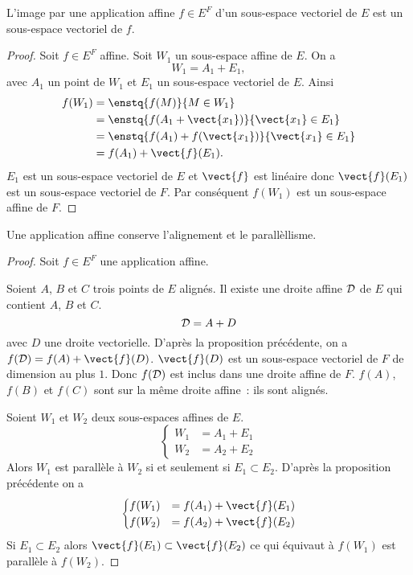 \begin{prop}
  L'image par une application affine $f \in E^F$ d'un sous-espace vectoriel de $E$ est un sous-espace vectoriel de $f$.
\end{prop}
\begin{proof}
  Soit $f \in E^F$ affine. Soit $W_1$ un sous-espace affine de $E$. On a
  \begin{equation}
    W_1 = A_1 +E_1,
  \end{equation}
  avec $A_1$ un point de $W_1$ et $E_1$ un sous-espace vectoriel de $E$. Ainsi
  \begin{align}
    f(W_1) &= \enstq{f(M)}{M \in W_1} \\
    &= \enstq{f(A_1+\vect{x_1})}{\vect{x_1} \in E_1} \\
    &= \enstq{f(A_1)+f(\vect{x_1})}{\vect{x_1} \in E_1} \\
    &=f(A_1) + \vect{f}(E_1).
  \end{align}
  $E_1$ est un sous-espace vectoriel de $E$ et $\vect{f}$ est linéaire donc $\vect{f}(E_1)$ est un sous-espace vectoriel de $F$. Par conséquent $f(W_1)$ est un sous-espace affine de $F$.
\end{proof}
%
\begin{prop}
  Une application affine conserve l'alignement et le parallèllisme.
\end{prop}
\begin{proof}
  Soit $f \in E^F$ une application affine.

  Soient $A$, $B$ et $C$ trois points de $E$ alignés. Il existe une droite affine $\mathcal{D}$ de $E$ qui contient $A$, $B$ et $C$.
  \begin{equation}
    \mathcal{D} = A+D
  \end{equation}
  avec $D$ une droite vectorielle. D'après la proposition précédente, on a $f(\Dr) = f(A) + \vect{f}(D)$. $\vect{f}(D)$ est un sous-espace vectoriel de $F$ de dimension au plus $1$. Donc $f(\mathcal{D})$ est inclus dans une droite affine de $F$. $f(A)$, $f(B)$ et $f(C)$ sont sur la même droite affine~: ils sont alignés.

  Soient $W_1$ et $W_2$ deux sous-espaces affines de $E$.
  \begin{equation}
    \begin{cases}
      W_1 &= A_1+E_1 \\
      W_2 &= A_2+E_2
    \end{cases}
  \end{equation}
  Alors $W_1$ est parallèle à $W_2$ si et seulement si $E_1 \subset E_2$. D'après la proposition précédente on a
  \begin{equation}
    \begin{cases}
      f(W_1) &= f(A_1)+\vect{f}(E_1) \\
      f(W_2) &= f(A_2)+\vect{f}(E_2)
    \end{cases}
  \end{equation}
  Si $E_1 \subset E_2$ alors $\vect{f}(E_1) \subset \vect{f}(E_2)$ ce qui équivaut à $f(W_1)$ est parallèle à $f(W_2)$.
\end{proof}

